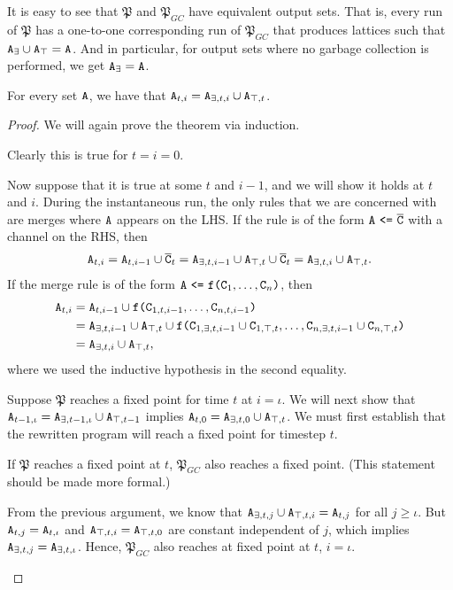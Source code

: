 It is easy to see that $\mathfrak{P}$ and $\mathfrak{P}_{GC}$ have equivalent output sets.
That is, every run of $\mathfrak{P}$ has a one-to-one corresponding run of $\mathfrak{P}_{GC}$ that produces lattices such that $\tt{A}_\exists \cup \tt{A}_\top = \tt{A}$.
And in particular, for output sets where no garbage collection is performed, we get $\tt{A}_\exists = \tt{A}$.

\begin{thm}
\label{thm:equivalence_of_sets}
For every set $\tt{A}$, we have that $\tt{A}_{t,i} = \tt{A}_{\exists,t,i} \cup \tt{A}_{\top,t}$.
\end{thm}
\begin{proof}
We will again prove the theorem via induction.

Clearly this is true for $t=i=0$.

Now suppose that it is true at some $t$ and $i-1$, and we will show it holds at $t$ and $i$.
During the instantaneous run, the only rules that we are concerned with are merges where $\tt{A}$ appears on the LHS.
If the rule is of the form $\tt{A} ~\tt{<=}~ \overline{\tt{C}}$ with a channel on the RHS, then
\begin{align*}
\tt{A}_{t,i}
= \tt{A}_{t,i-1} \cup \overline{\tt{C}}_{t}
= \tt{A}_{\exists,t,i-1} \cup \tt{A}_{\top,t} \cup \overline{\tt{C}}_{t}
= \tt{A}_{\exists,t,i} \cup \tt{A}_{\top,t}.
\end{align*}
If the merge rule is of the form $\tt{A} ~\tt{<=}~ \tt{f}\tt{(}\tt{C}_1,\dots,\tt{C}_n\tt{)}$, then
\begin{align*}
\tt{A}_{t,i}
&= \tt{A}_{t,i-1} \cup \tt{f}\tt{(}\tt{C}_{1,t,i-1},\dots,\tt{C}_{n,t,i-1}\tt{)}\\
&= \tt{A}_{\exists,t,i-1} \cup \tt{A}_{\top,t} \cup \tt{f}\tt{(}\tt{C}_{1,\exists,t,i-1}\cup\tt{C}_{1,\top,t},\dots,\tt{C}_{n,\exists,t,i-1}\cup\tt{C}_{n,\top,t}\tt{)}\\
&= \tt{A}_{\exists,t,i} \cup \tt{A}_{\top,t},
\end{align*}
where we used the inductive hypothesis in the second equality.

Suppose $\mathfrak{P}$ reaches a fixed point for time $t$ at $i=\iota$.
We will next show that $\tt{A}_{t-1,\iota} = \tt{A}_{\exists,t-1,\iota} \cup \tt{A}_{\top,t-1}$ implies $\tt{A}_{t,0} = \tt{A}_{\exists,t,0} \cup \tt{A}_{\top,t}$.
We must first establish that the rewritten program will reach a fixed point for timestep $t$.

\begin{claim}
If $\mathfrak{P}$ reaches a fixed point at $t$, $\mathfrak{P}_{GC}$ also reaches a fixed point.
(This statement should be made more formal.)
\end{claim}
\begin{claimproof}
From the previous argument, we know that $\tt{A}_{\exists,t,j} \cup \tt{A}_{\top,t,i} = \tt{A}_{t,j}$ for all $j \geq \iota$.
But $\tt{A}_{t,j} = \tt{A}_{t,\iota}$ and $\tt{A}_{\top,t,i} = \tt{A}_{\top,t,0}$ are constant independent of $j$, which implies $\tt{A}_{\exists,t,j} = \tt{A}_{\exists,t,\iota}$.
Hence, $\mathfrak{P}_{GC}$ also reaches at fixed point at $t$, $i=\iota$.
\end{claimproof}


\end{proof}
